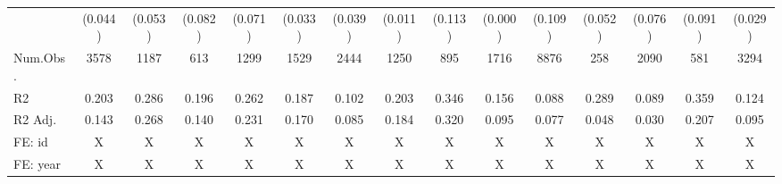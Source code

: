 \begin{table}
\begin{tabular}[t]{lcccccccccccccc}
\hspace{1em} & (0.044) & (0.053) & (0.082) & (0.071) & (0.033) & (0.039) & (0.011) & (0.113) & (0.000) & (0.109) & (0.052) & (0.076) & (0.091) & (0.029)\\
\hspace{1em}Num.Obs. & 3578 & 1187 & 613 & 1299 & 1529 & 2444 & 1250 & 895 & 1716 & 8876 & 258 & 2090 & 581 & 3294\\
\hspace{1em}R2 & 0.203 & 0.286 & 0.196 & 0.262 & 0.187 & 0.102 & 0.203 & 0.346 & 0.156 & 0.088 & 0.289 & 0.089 & 0.359 & 0.124\\
\hspace{1em}R2 Adj. & 0.143 & 0.268 & 0.140 & 0.231 & 0.170 & 0.085 & 0.184 & 0.320 & 0.095 & 0.077 & 0.048 & 0.030 & 0.207 & 0.095\\
\hspace{1em}FE: id & X & X & X & X & X & X & X & X & X & X & X & X & X & X\\
\hspace{1em}FE: year & X & X & X & X & X & X & X & X & X & X & X & X & X & X\\
\bottomrule
\end{tabular}
\end{table}